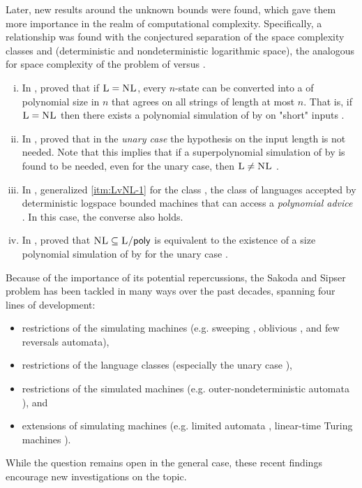 Later, new results around the unknown bounds were found, which gave them more importance in the realm of computational complexity.
Specifically, a relationship was found with the conjectured separation of the space complexity classes \cL and \cNL (deterministic and nondeterministic logarithmic space), the analogous for space complexity of the problem of \cP versus \cNP.
\begin{enumerate}[(i)]
	\item\label{itm:LvNL-1} In \citeyear{BerLin77}, \citeauthor{BerLin77} proved that if $\textsc{L}=\textsc{NL}$, every $n$-state \TNFA can be converted into a \TDFA of polynomial size in $n$ that agrees on all strings of length at most $n$.
	      That is, if $\textsc{L}=\textsc{NL}$ then there exists a polynomial simulation of \TNFAs by \TDFAs on "short" inputs \cite{BerLin77}.
	\item In \citeyear{GefPig11}, \citeauthor{GefPig11} proved that in the \emph{unary case} the hypothesis on the input length is not needed.
	      Note that this implies that if a superpolynomial simulation of \TNFAs by \TDFAs is found to be needed, even for the unary case, then $\textsc{L}\ne\textsc{NL}$ \cite{GefPig11}.
	\item In \citeyear{Kap14}, \citeauthor{Kap14} generalized \ref{itm:LvNL-1} for the class \cPolyL, the class of languages accepted by deterministic logspace bounded machines that can access a \emph{polynomial advice} \cite{Kap14,KarLip82}. In this case, the converse also holds.
	\item In \citeyear{KapPig12}, \citeauthor{KapPig12} proved that $\textsc{NL}\subseteq\textsc{L/\ensuremath{\mathsf{poly}}}$ is equivalent to the existence of a size polynomial simulation of \TNFAs by \TDFAs for the unary case \cite{KapPig12}.
\end{enumerate}

Because of the importance of its potential repercussions, the Sakoda and Sipser problem has been tackled in many ways over the past decades, spanning four lines of development:
\begin{itemize}
	\item restrictions of the simulating machines (e.g. sweeping \cite{Sip80}, oblivious \cite{HroSch03}, and few reversals \cite{Kap13} automata),
	\item restrictions of the language classes (especially the unary case \cite{GefMer+07}),
	\item restrictions of the simulated machines (e.g. outer-nondeterministic automata \cite{GefGui+14,KapPig12}), and
	\item extensions of simulating machines (e.g. limited automata \cite{PigPis14,PigPri19,GuiPri19,PigPri+22}, linear-time Turing machines \cite{Pru14,GuiPig+18,Hen65,GuiPig+23,Har68}).
\end{itemize}
While the question remains open in the general case, these recent findings encourage new investigations on the topic.

